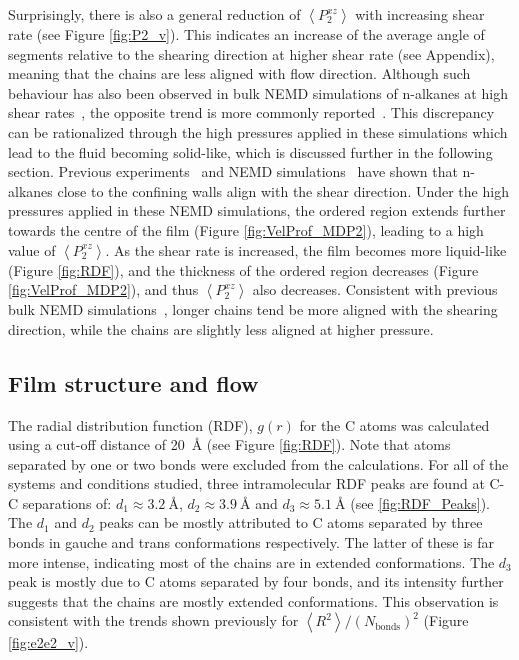 \documentclass[5p]{elsarticle}
\begin{document}
Surprisingly, there is also a general reduction of $\left<P_{2}^{xz} \right> $ with increasing shear rate (see Figure \ref{fig:P2_v}). This indicates an increase of the average angle of segments relative to the shearing direction at higher shear rate (see Appendix), meaning that the chains are less aligned with flow direction. Although such behaviour has also been observed in bulk NEMD simulations of n-alkanes at high shear rates~\cite{Padilla1992}, the opposite trend is more commonly reported~\cite{Cho2017,Cui1996}. This discrepancy can be rationalized through the high pressures applied in these simulations which lead to the fluid becoming solid-like, which is discussed further in the following section. Previous experiments~\cite{Drummond2002} and NEMD simulations~\cite{Cho2017} have shown that n-alkanes close to the confining walls align with the shear direction. Under the high pressures applied in these NEMD simulations, the ordered region extends further towards the centre of the film (Figure \ref{fig:VelProf_MDP2}), leading to a high value of $\left<P_{2}^{xz} \right> $. As the shear rate is increased, the film becomes more liquid-like (Figure \ref{fig:RDF}), and the thickness of the ordered region decreases (Figure \ref{fig:VelProf_MDP2}), and thus $\left<P_{2}^{xz} \right> $ also decreases. Consistent with previous bulk NEMD simulations~\cite{Cui1996}, longer chains tend be more aligned with the shearing direction, while the chains are slightly less aligned at higher pressure.

\subsection{Film structure and flow}
\label{str}

The radial distribution function (RDF), $g(r)$ for the C atoms was calculated using a cut-off distance of \SI{20}{\angstrom} (see Figure \ref{fig:RDF}). Note that atoms separated by one or two bonds were excluded from the calculations. For all of the systems and conditions studied, three intramolecular RDF peaks are found at C-C separations of: $d_1 \approx \SI{3.2}{\angstrom}$, $d_2 \approx \SI{3.9}{\angstrom}$ and $d_3 \approx \SI{5.1}{\angstrom}$ (see \ref{fig:RDF_Peaks}). The $d_1$ and $d_2$ peaks can be mostly attributed to C atoms separated by three bonds in gauche and trans conformations respectively. The latter of these is far more intense, indicating most of the chains are in extended conformations. The $d_3$ peak is mostly due to C atoms separated by four bonds, and its intensity further suggests that the chains are mostly extended conformations. This observation is consistent with the trends shown previously for $\left< R^2 \right>/\left(N_\text{bonds}\right)^2$ (Figure \ref{fig:e2e2_v}).
\end{document}
